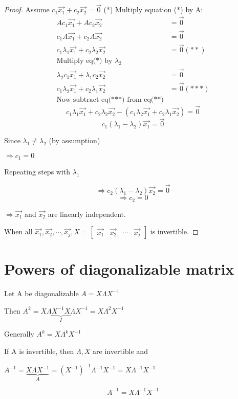 \documentclass[12pt]{amsart}
\numberwithin{equation}{theorem}    %
\newcommand{\drawvec}[1]{                    %
    \begin{bmatrix}
        #1
    \end{bmatrix}
}
\begin{document}
\begin{proof}
    Assume $c_1 \vec{x_1} + c_2 \vec{x_2} = \vec{0}$ (*)
    Multiply equation (*) by A:
    \begin{align*}
        Ac_1 \vec{x_1} + Ac_2 \vec{x_2}                   & = \vec{0}       \\
        c_1 A\vec{x_1} + c_2 A\vec{x_2}                   & = \vec{0}       \\
        c_1 \lambda_1\vec{x_1} + c_2 \lambda_2\vec{x_2}   & = \vec{0} (**)  \\
        \text{Multiply eq(*) by }\lambda_2                &                 \\
        \lambda_2 c_1 \vec{x_1} + \lambda_1 c_2 \vec{x_2} & = \vec{0}       \\
        c_1 \lambda_2\vec{x_1} + c_2 \lambda_1 \vec{x_2}  & = \vec{0} (***) \\
        \text{Now subtract eq(***) from eq(**)}           &
    \end{align*}
    $$c_1 \lambda_1\vec{x_1} + c_2 \lambda_2\vec{x_2}  - (c_1 \lambda_2\vec{x_1} + c_2 \lambda_1 \vec{x_2}) = \vec{0}$$
    $$c_1(\lambda_1 - \lambda_2) \vec{x_1} = \vec{0}$$

    Since $\lambda_1 \neq \lambda_2$ (by assumption)

    $\Rightarrow c_1 = 0$

    Repeating steps with $\lambda_1$

    $$\Rightarrow c_2(\lambda_1 - \lambda_2)\vec{x_2} = \vec{0}$$
    $$\Rightarrow c_2 = 0$$

    $\Longrightarrow \vec{x_1}$ and $\vec{x_2}$ are linearly independent.

    When all $\vec{x_1}, \vec{x_2}, \cdots, \vec{x_j}, X=\drawvec{\vec{x_1} & \vec{x_2} & \cdots & \vec{x_j}}$ is invertible.
\end{proof}

\section{Powers of diagonalizable matrix}

Let A be diagonalizable $A=X\Lambda X^{-1}$

Then $A^2 = X\Lambda \underbrace{X^{-1} X}_{I}\Lambda X^{-1} =X\Lambda^2 X^{-1}$

Generally $A^k =X\Lambda^k X^{-1}$

If A is invertible, then $\Lambda, X$ are invertible and

$A^{-1} = \underbrace{X\Lambda X^{-1}}_{A} = (X^{-1})^{-1} \Lambda^{-1} X^{-1} = X\Lambda^{-1}X^{-1}$

$$A^{-1} = X\Lambda^{-1} X^{-1}$$
\end{document}
